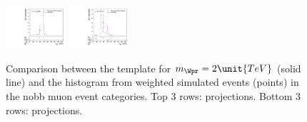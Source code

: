 \begin{figure}[htpb]
  \includegraphics[width=0.2\textwidth]{fig/analysisAppendix/templateVsReco_WprToWZ2000_r0_MJ_mu_HP_vbf_HDy.pdf}
  \includegraphics[width=0.2\textwidth]{fig/analysisAppendix/templateVsReco_WprToWZ2000_r0_MJ_mu_LP_vbf_HDy.pdf}\\
  \caption{
    Comparison between the \DY\WprtoWZ template for $m_{\Wpr}=2\unit{TeV}$ (solid line) and the histogram from weighted simulated events (points) in the nobb muon event categories.
    Top 3 rows: \MVV projections.
    Bottom 3 rows: \MJ projections.
  }
  \label{fig:1dtemplateVsReco_WprToWZ2000}
\end{figure}

